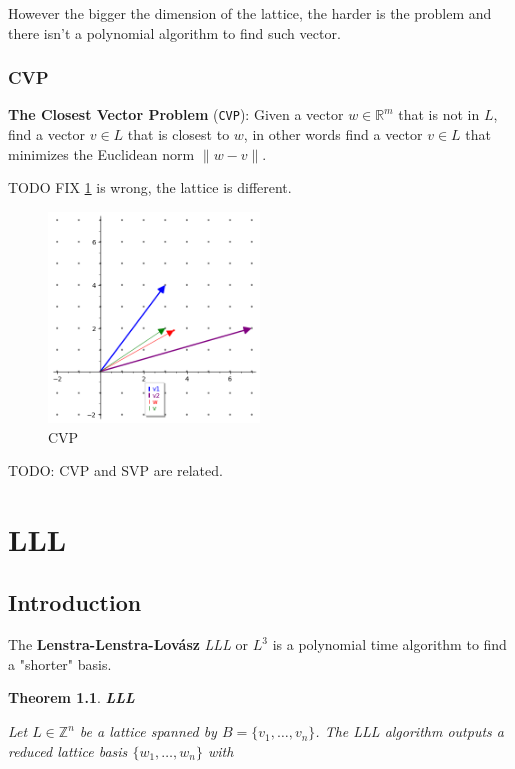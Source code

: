 \documentclass[a4paper,12pt]{report}
\newtheorem{theorem}{Theorem}[section]
\newcommand{\R}{\mathbb{R}}
\newcommand{\Z}{\mathbb{Z}}
\begin{document}
However the bigger the dimension of the lattice, the harder is the problem and there isn't a polynomial algorithm to find such vector.

\subsection{CVP}

\textbf{The Closest Vector Problem} (\texttt{CVP}): Given a vector $w \in \R^m$ that is not in $L$, find a vector $v \in L$ that is closest to $w$,
in other words find a vector $v \in L$ that minimizes the Euclidean norm $\lVert w - v \rVert$.

TODO FIX \ref{fig:cvp} is wrong, the lattice is different.

\begin{figure}[t]
    \centering
    \includegraphics[width=0.5\textwidth]{./img/cvp.png}
    \caption{CVP}
    \label{fig:cvp}
\end{figure}

TODO: CVP and SVP are related.

\chapter{LLL}

\section{Introduction}

The \textbf{Lenstra-Lenstra-Lovász} \textit{LLL} or \textit{$L^3$} is a polynomial time algorithm to find a "shorter" basis.

\begin{theorem}
    \textbf{LLL}
\end{theorem}

\textit{Let $L \in \Z^n$ be a lattice spanned by $B = \{v_1,\ldots,v_n\}$. The LLL algorithm outputs a reduced lattice
basis $\{w_1, \ldots, w_n\}$ with}
\end{document}
